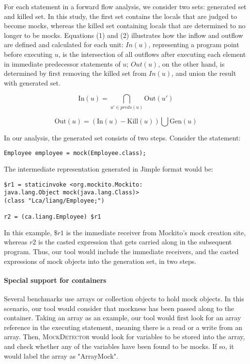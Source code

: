 For each statement in a forward flow analysis, we consider two sets: generated set and killed set. In this study, the first set contains the locals that are judged to become mocks, whereas the killed set containing locals that are determined to no longer to be mocks. Equations (1) and (2) illustrates how the inflow and outflow are defined and calculated for each unit: $In(u)$, representing a program point before executing $u$, is the intersection of all outflows after executing each element in immediate predecessor statements of $u$; $Out(u)$, on the other hand, is determined by first removing the killed set from $In(u)$, and union the result with generated set. 

\begin{equation}
\mathrm{In}(u) = \bigcap_{u' \in preds(u)} \mathrm{Out}(u') 
\end{equation}

\begin{equation}
\mathrm{Out}(u) = (\mathrm{In}(u) - \mathrm{Kill}(u)) \bigcup \mathrm{Gen}(u) 
\end{equation}

In our analysis, the generated set consists of two steps. Consider the statement: 
\begin{lstlisting}[basicstyle=\ttfamily\small,numbers=none]
Employee employee = mock(Employee.class);
\end{lstlisting}
The intermediate representation generated in Jimple format would be:
\begin{lstlisting}[basicstyle=\ttfamily\small,numbers=none]
$r1 = staticinvoke <org.mockito.Mockito: 
java.lang.Object mock(java.lang.Class)>
(class "Lca/liang/Employee;")

r2 = (ca.liang.Employee) $r1
\end{lstlisting}

In this example, $\$r1$ is the immediate receiver from Mockito's mock creation site, whereas $r2$ is the casted expression that gets carried along in the subsequent program. Thus, our tool would include the immediate receivers, and the casted expressions of mock objects into the generation set, in two steps. 

\paragraph{Special support for containers} Several benchmarks use arrays or collection objects to hold mock objects. In this scenario, our tool would consider that mockness has been passed along to the container. Taking an array as an example, our tool would first look for an array reference in the executing statement, meaning there is a read or a write from an array. Then, \textsc{MockDetector} would look for variables to be stored into the array, and check whether any of the variables have been found to be mocks. If so, it would label the array as "ArrayMock".

